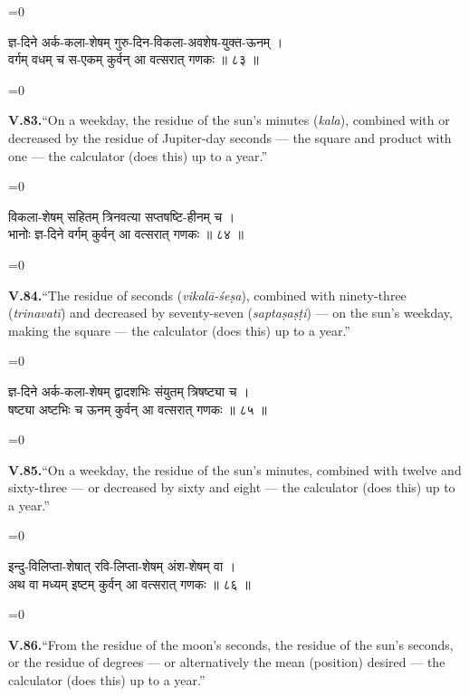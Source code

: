 \documentclass[11pt,a4paper]{article}
\newcommand{\dev}[1]{{\devanagarifont\color{sktcolor}#1}}
\newcommand{\iast}[1]{\textit{#1}}
\newenvironment{paracol}[1]{\begingroup}{\endgroup}
\newcommand{\switchcolumn}[1][]{%
  \ifnum#1=0\relax\else\par\nobreak\vspace{0.5em}\par\nobreak\fi%
}
\begin{document}
\vspace{0.3cm}

\begin{paracol}{2}
\switchcolumn[0]
\dev{%
ज्ञ-दिने अर्क-कला-शेषम् गुरु-दिन-विकला-अवशेष-युक्त-ऊनम् ।\\
वर्गम् वधम् च स-एकम् कुर्वन् आ वत्सरात् गणकः ॥ ८३ ॥
}

\switchcolumn[1]
\textbf{V.83.}\quad ``On a weekday, the residue of the sun's minutes
(\iast{kala}), combined with or decreased by the residue of
Jupiter-day seconds — the square and product with one — the
calculator (does this) up to a year.''
\end{paracol}

\vspace{0.3cm}

\begin{paracol}{2}
\switchcolumn[0]
\dev{%
विकला-शेषम् सहितम् त्रिनवत्या सप्तषष्टि-हीनम् च ।\\
भानोः ज्ञ-दिने वर्गम् कुर्वन् आ वत्सरात् गणकः ॥ ८४ ॥
}

\switchcolumn[1]
\textbf{V.84.}\quad ``The residue of seconds (\iast{vikalā-śeṣa}),
combined with ninety-three (\iast{trinavatī}) and decreased by
seventy-seven (\iast{saptaṣaṣṭi}) — on the sun's weekday, making
the square — the calculator (does this) up to a year.''
\end{paracol}

\vspace{0.3cm}

\begin{paracol}{2}
\switchcolumn[0]
\dev{%
ज्ञ-दिने अर्क-कला-शेषम् द्वादशभिः संयुतम् त्रिषष्ट्या च ।\\
षष्ट्या अष्टभिः च ऊनम् कुर्वन् आ वत्सरात् गणकः ॥ ८५ ॥
}

\switchcolumn[1]
\textbf{V.85.}\quad ``On a weekday, the residue of the sun's minutes,
combined with twelve and sixty-three — or decreased by sixty and
eight — the calculator (does this) up to a year.''
\end{paracol}

\vspace{0.3cm}

\begin{paracol}{2}
\switchcolumn[0]
\dev{%
इन्दु-विलिप्ता-शेषात् रवि-लिप्ता-शेषम् अंश-शेषम् वा ।\\
अथ वा मध्यम् इष्टम् कुर्वन् आ वत्सरात् गणकः ॥ ८६ ॥
}

\switchcolumn[1]
\textbf{V.86.}\quad ``From the residue of the moon's seconds, the
residue of the sun's seconds, or the residue of degrees — or
alternatively the mean (position) desired — the calculator (does
this) up to a year.''
\end{paracol}
\end{document}

